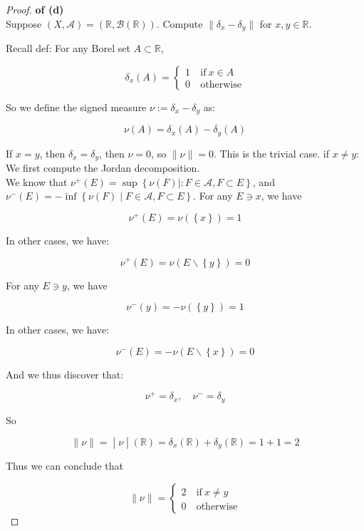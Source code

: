 \documentclass{qlnotes-export}
\begin{document}
\begin{proof}

\textbf{of (d)}\\
Suppose \((X,\mathcal{A}) = ({\mathbb{R}},\mathcal{B}({\mathbb{R}}))\). Compute \(\parallel \delta_{x} - \delta_{y} \parallel\) for \(x,y \in {\mathbb{R}}\).

Recall def: For any Borel set \(A \subset {\mathbb{R}}\),

\[\delta_{x}(A) = \left\{ \begin{matrix}
{1\ } & {\text{if}\ x \in A} \\
{0\ } & \text{otherwise}
\end{matrix} \right.\]

So we define the signed measure \(\nu := \delta_{x} - \delta_{y}\) as:

\[\nu(A) = \delta_{x}(A) - \delta_{y}(A)\]

If \(x = y\), then \(\delta_{x} = \delta_{y}\), then \(\nu = 0\), so \(\parallel \nu \parallel = 0\). This is the trivial case. if \(x \neq y\): We first compute the Jordan decomposition.\\
We know that \(\nu^{+}(E) = \sup\left\{ {\nu(F) \mid :F \in \mathcal{A},F \subset E} \right\}\), and \(\nu^{-}(E) = - \inf\left\{ {\nu(F) \mid F \in \mathcal{A},F \subset E} \right\}\). For any \(E \ni x\), we have

\[\nu^{+}(E) = \nu(\left\{ x \right\}) = 1\]

In other cases, we have:

\[\nu^{+}(E) = \nu(E\backslash\left\{ y \right\}) = 0\]

For any \(E \ni y\), we have

\[\nu^{-}(y) = - \nu(\left\{ y \right\}) = 1\]

In other cases, we have:

\[\nu^{-}(E) = - \nu(E\backslash\left\{ x \right\}) = 0\]

And we thus discover that:

\[\nu^{+} = \delta_{x},\quad\nu^{-} = \delta_{y}\]

So

\[\left. \parallel \nu \parallel = \middle| \nu \middle| ({\mathbb{R}}) = \delta_{x}({\mathbb{R}}) + \delta_{y}({\mathbb{R}}) = 1 + 1 = 2 \right.\]

Thus we can conclude that

\[\parallel \nu \parallel = \left\{ \begin{matrix}
{2\ } & {\text{if}\ x \neq y} \\
{0\ } & \text{otherwise}
\end{matrix} \right.\]

\end{proof}
\end{document}

